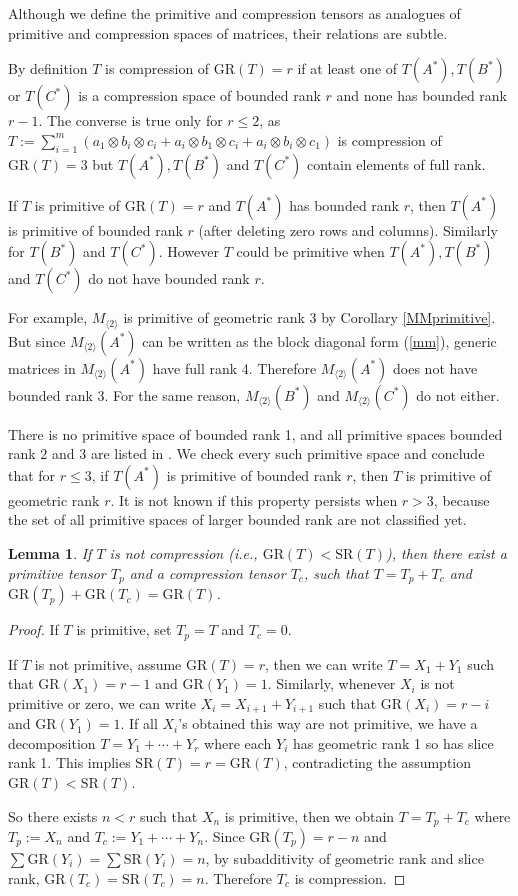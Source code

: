 \documentclass[10pt]{article} %
\newcommand{\GR}{\mathrm{GR}}
\newcommand{\SR}{\mathrm{SR}}
\newcommand{\ot}{\otimes}
\newtheorem{lem}[thm]{Lemma}
\theoremstyle{definition}
\begin{document}
Although we define the primitive and compression tensors as analogues of primitive and compression spaces of matrices, their relations are subtle.

By definition $T$ is compression of $\GR(T)=r$ if at least one of $T(A^*),T(B^*)$ or $T(C^*)$ is a compression space of bounded rank $r$ and none has bounded rank $r-1$. The converse is true only for $r\leq 2$, as $T:=\sum_{i=1}^{m}(a_1\ot b_i\ot c_i+a_i\ot b_1\ot c_i+a_i\ot b_i\ot c_1)$ is compression of $\GR(T)=3$ but $T(A^*),T(B^*)$ and $T(C^*)$ contain elements of full rank.

If $T$ is primitive of $\GR(T)=r$ and $T(A^*)$ has bounded rank $r$, then $T(A^*)$ is primitive of bounded rank $r$ (after deleting zero rows and columns). Similarly for $T(B^*)$ and $T(C^*)$. However $T$ could be primitive when $T(A^*),T(B^*)$ and $T(C^*)$ do not have bounded rank $r$. 

For example, $M_{\langle 2\rangle}$ is primitive of geometric rank 3 by Corollary \ref{MMprimitive}. But since $M_{\langle 2\rangle}(A^*)$ can be written as the block diagonal form (\ref{mm}), generic matrices in $M_{\langle 2\rangle}(A^*)$ have full rank 4. Therefore $M_{\langle 2\rangle}(A^*)$ does not have bounded rank 3. For the same reason, $M_{\langle 2\rangle}(B^*)$ and $M_{\langle 2\rangle}(C^*)$ do not either.

There is no primitive space of bounded rank 1, and all primitive spaces bounded rank $2$ and $3$ are listed in \cite{Atk83,EH88}. We check every such primitive space and conclude that for $r\leq 3$, if $T(A^*)$ is primitive of bounded rank $r$, then $T$ is primitive of geometric rank $r$. It is not known if this property persists when $r>3$, because the set of all primitive spaces of larger bounded rank are not classified yet.



\begin{lem}\label{decomplem}
If $T$ is not compression (i.e., $\GR(T)<\SR(T)$), then there exist a primitive tensor $T_p$ and a compression tensor $T_c$, such that $T=T_p+T_c$ and $\GR(T_p)+\GR(T_c)=\GR(T)$.
\end{lem}
\begin{proof}
If $T$ is primitive, set $T_p=T$ and $T_c=0$.

If $T$ is not primitive, assume $\GR(T)=r$, then we can write $T=X_1+Y_1$ such that $\GR(X_1)=r-1$ and $\GR(Y_1)=1$. Similarly, whenever $X_i$ is not primitive or zero, we can write $X_i=X_{i+1}+Y_{i+1}$ such that $\GR(X_i)=r-i$ and $\GR(Y_1)=1$. If all $X_i$'s obtained this way are not primitive, we have a decomposition $T=Y_1+\cdots+Y_r$ where each $Y_i$ has geometric rank 1 so has slice rank 1. This implies $\mathrm{SR}(T)=r=\mathrm{GR}(T)$, contradicting the assumption $\GR(T)<\SR(T)$. 

So there exists $n<r$ such that $X_n$ is primitive, then we obtain $T=T_p+T_c$ where $T_p:=X_n$ and $T_c:=Y_1+\cdots+Y_n$. Since $\GR(T_p)=r-n$ and $\sum\GR(Y_i)=\sum\SR(Y_i)=n$, by subadditivity of geometric rank and slice rank, $\GR(T_c)=\SR(T_c)=n$. Therefore $T_c$ is compression.
\end{proof}
\end{document}
